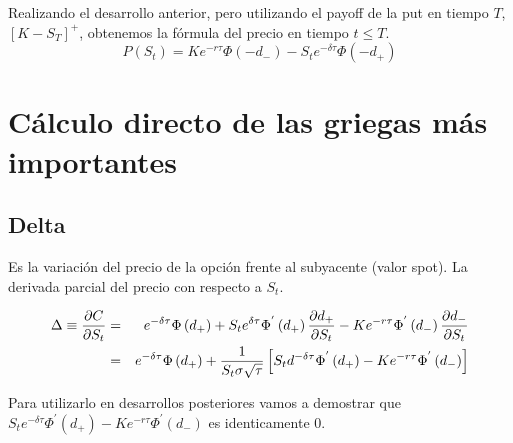\documentclass[12pt]{article}
\begin{document}
Realizando el desarrollo anterior, pero utilizando el payoff de la put en tiempo $T$, $\left[K-S_{T}\right]^{+}$, obtenemos
la f\'{o}rmula del precio en tiempo $t\leq T$.
\newline
\begin{equation}
	P\left(S_{t}\right) = Ke^{-r\tau}\Phi\left(-d_{-}\right) - S_{t}e^{-\delta\tau}\Phi\left(-d_{+}\right)
\end{equation}
\newpage

\section{C\'{a}lculo directo de las griegas m\'{a}s importantes}
\subsection{Delta}

Es la variaci\'{o}n del precio de la opci\'{o}n frente al subyacente (valor spot). La derivada parcial del precio con respecto a 
$S_{t}$.
\newline

\begin{eqnarray}
	\Delta\equiv\frac{\partial C}{\partial S_{t}} & = & e^{-\delta\tau}\Phi\left(d_{+}\right) + 
								S_{t}e^{\-\delta\tau}\Phi^{'}\left(d_{+}\right)
								\frac{\partial d_{+}}{\partial S_{t}} - Ke^{-r\tau}
								\Phi^{'}\left(d_{-}\right)\frac{\partial d_{-}}{\partial S_{t}} 
								\nonumber \\
					& = & e^{-\delta\tau}\Phi\left(d_{+}\right) + 
						\frac{1}{S_{t}\sigma\sqrt{\tau}}\left[S_{t}d^{-\delta\tau}
						\Phi^{'}\left(d_{+}\right)-Ke^{-r\tau}\Phi^{'}\left(d_{-}\right)\right] 
								\nonumber 
\end{eqnarray}
\newline

Para utilizarlo en desarrollos posteriores vamos a demostrar que $S_{t}e^{-\delta\tau}\Phi^{'}\left(d_{+}\right) - 
Ke^{-r\tau}\Phi^{'}\left(d_{-}\right)$ es identicamente $0$.
\newline
\end{document}
